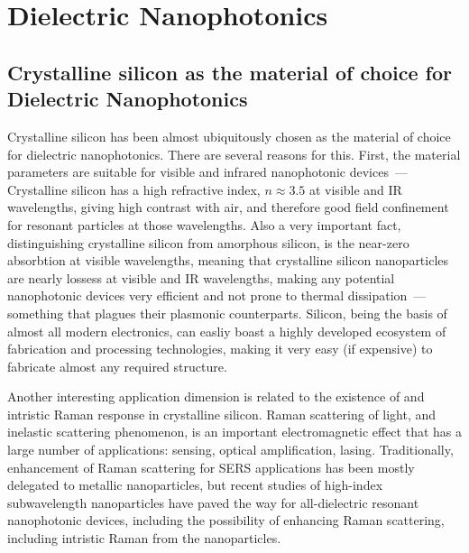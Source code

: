 \section{Dielectric Nanophotonics}
\label{ch:DielectricNanophotoics}

    \subsection{Crystalline silicon as the material of choice for Dielectric Nanophotonics}
            Crystalline silicon has been almost ubiquitously chosen as the material of choice for dielectric nanophotonics.
        There are several reasons for this. First, the material parameters are suitable for visible and infrared nanophotonic devices~---
        Crystalline silicon has a high refractive index, $n \approx 3.5$ at visible and IR wavelengths\cite{li1980refractive}, giving high contrast
        with air, and therefore good field confinement for resonant particles at those wavelengths\cite{mie1908beitrage, dmitriev2016resonant}. Also
        a very important fact, distinguishing crystalline silicon from amorphous silicon, is the near-zero absorbtion at visible wavelengths, meaning
        that crystalline silicon nanoparticles are nearly lossess at visible and IR wavelengths, making any potential nanophotonic devices very
        efficient and not prone to thermal dissipation~--- something that plagues their plasmonic counterparts.
            Silicon, being the basis of almost all modern electronics, can easliy boast a highly developed ecosystem of fabrication and processing
        technologies, making it very easy (if expensive) to fabricate almost any required structure.

            Another interesting application dimension is related to the existence of and intristic Raman response in crystalline silicon. Raman
        scattering of light, and inelastic scattering phenomenon, is an important electromagnetic effect\cite{hayes2012scattering} that has a large number of applications:
        sensing\cite{moskovits1985surface}, optical amplification\cite{islam2004wideband}, lasing\cite{pask2003design}.
        Traditionally, enhancement of Raman scattering for SERS applications has been mostly delegated to metallic nanoparticles, but
        recent studies of high-index subwavelength nanoparticles have paved the way for all-dielectric resonant nanophotonic devices, including
        the possibility of enhancing Raman scattering, including intristic Raman from the nanoparticles.

